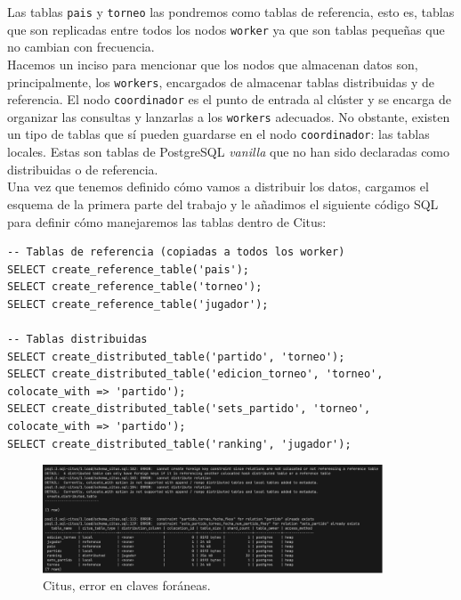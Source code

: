 Las tablas \texttt{pais} y \texttt{torneo} las pondremos como tablas de referencia, esto es, tablas que son replicadas entre todos los nodos \texttt{worker} ya que son tablas pequeñas que no cambian con frecuencia. \\

Hacemos un inciso para mencionar que los nodos que almacenan datos son, principalmente, los \texttt{workers}, encargados de almacenar tablas distribuidas y de referencia. El nodo \texttt{coordinador} es el punto de entrada al clúster y se encarga de organizar las consultas y lanzarlas a los \texttt{workers} adecuados. No obstante, existen un tipo de tablas que sí pueden guardarse en el nodo \texttt{coordinador}: las tablas locales. Estas son tablas de PostgreSQL \textit{vanilla} que no han sido declaradas como distribuidas o de referencia. \\

Una vez que tenemos definido cómo vamos a distribuir los datos, cargamos el esquema de la primera parte del trabajo y le añadimos el siguiente código SQL para definir cómo manejaremos las tablas dentro de Citus:

\begin{verbatim}
-- Tablas de referencia (copiadas a todos los worker)
SELECT create_reference_table('pais');
SELECT create_reference_table('torneo');
SELECT create_reference_table('jugador');

-- Tablas distribuidas
SELECT create_distributed_table('partido', 'torneo');
SELECT create_distributed_table('edicion_torneo', 'torneo', colocate_with => 'partido');
SELECT create_distributed_table('sets_partido', 'torneo', colocate_with => 'partido');
SELECT create_distributed_table('ranking', 'jugador');
\end{verbatim}

\begin{figure}[H]
\centering
\includegraphics[width=0.9\textwidth]{fotos/citus/foreig_key_error.png}
\caption{Citus, error en claves foráneas.}
\label{fig:fk_citus}
\end{figure}

